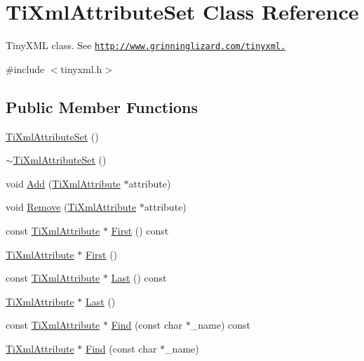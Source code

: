\hypertarget{class_ti_xml_attribute_set}{
\section{TiXmlAttributeSet Class Reference}
\label{class_ti_xml_attribute_set}
}


TinyXML class. See \href{http://www.grinninglizard.com/tinyxml.}{\tt http://www.grinninglizard.com/tinyxml.}  


{\ttfamily \#include $<$tinyxml.h$>$}\subsection*{Public Member Functions}
\begin{DoxyCompactItemize}
\item 
\hyperlink{class_ti_xml_attribute_set_a253c33b657cc85a07f7f060b02146c35}{TiXmlAttributeSet} ()
\item 
\hyperlink{class_ti_xml_attribute_set_add463905dff96142a29fe16a01ecf28f}{$\sim$TiXmlAttributeSet} ()
\item 
void \hyperlink{class_ti_xml_attribute_set_a745e50ddaae3bee93e4589321e0b9c1a}{Add} (\hyperlink{class_ti_xml_attribute}{TiXmlAttribute} $\ast$attribute)
\item 
void \hyperlink{class_ti_xml_attribute_set_a924a73d071f2573f9060f0be57879c57}{Remove} (\hyperlink{class_ti_xml_attribute}{TiXmlAttribute} $\ast$attribute)
\item 
const \hyperlink{class_ti_xml_attribute}{TiXmlAttribute} $\ast$ \hyperlink{class_ti_xml_attribute_set_ae0636e88cedd4b09d61c451860f68598}{First} () const 
\item 
\hyperlink{class_ti_xml_attribute}{TiXmlAttribute} $\ast$ \hyperlink{class_ti_xml_attribute_set_a99703bb08ca2aece2d7ef835de339ba0}{First} ()
\item 
const \hyperlink{class_ti_xml_attribute}{TiXmlAttribute} $\ast$ \hyperlink{class_ti_xml_attribute_set_a7b3f3ccf39a97bc25539d3fcc540296a}{Last} () const 
\item 
\hyperlink{class_ti_xml_attribute}{TiXmlAttribute} $\ast$ \hyperlink{class_ti_xml_attribute_set_ab4c4edfb2d74f6ea31aae096743bd6e0}{Last} ()
\item 
const \hyperlink{class_ti_xml_attribute}{TiXmlAttribute} $\ast$ \hyperlink{class_ti_xml_attribute_set_aacbbc5e1a1c987e72815430e89fcb58b}{Find} (const char $\ast$\_\-name) const 
\item 
\hyperlink{class_ti_xml_attribute}{TiXmlAttribute} $\ast$ \hyperlink{class_ti_xml_attribute_set_a2f210bed54c832adf1683c44c35727b9}{Find} (const char $\ast$\_\-name)
\end{DoxyCompactItemize}
